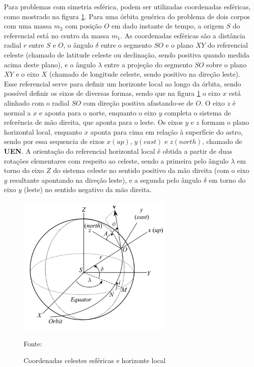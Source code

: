 Para problemas com simetria esférica, podem ser utilizadas coordenadas esféricas, como mostrado na figura \ref{fig:ESFCEL}. Para uma órbita genérica do problema de dois corpos com uma massa $m_{2}$ com posição $O$ em dado instante de tempo, a origem $S$ do referencial está no centro da massa $m_{1}$. As coordenadas esféricas são a distância radial $r$ entre $S$ e $O$, o ângulo $\delta$ entre o segmento $SO$ e o plano $XY$ do referencial celeste (chamado de latitude celeste ou declinação, sendo positiva quando medida acima deste plano), e o ângulo $\lambda$ entre a projeção do segmento $SO$ sobre o plano $XY$ e o eixo $X$ (chamado de longitude celeste, sendo positivo na direção leste). Esse referencial serve para definir um horizonte local ao longo da órbita, sendo possível definir os eixos de diversas formas, sendo que na figura \ref{fig:ESFCEL} o eixo $x$ está alinhado com o radial $SO$ com direção positiva afastando-se de $O$. O eixo $z$ é normal a $x$ e aponta para o norte, enquanto o eixo $y$ completa o sistema de referência de mão direita, que aponta para o leste. Os eixos $y$ e $z$ formam o plano horizontal local, enquanto $x$ aponta para cima em relação à superfície do astro, sendo por essa sequencia de eixos $x (up)$, $y (east)$ e $z (north)$, chamado de \textbf{UEN}. A orientação do referencial horizontal local é obtida a partir de duas rotações elementares com respeito ao celeste, sendo a primeira pelo ângulo $\lambda$ em torno do eixo $Z$ do sistema celeste no sentido positivo da mão direita (com o eixo $y$ resultante apontando na direção leste), e a segunda pelo ângulo $\delta$ em torno do eixo $y$ (leste) no sentido negativo da mão direita. 

\begin{figure}[h]
        \centering
        \includegraphics[width=3in]{figuras/ESFCEL.png}
        \caption{Coordenadas celestes esféricas e horizonte local}
        \footnotesize Fonte: \cite{livro:andre}
        \label{fig:ESFCEL}
\end{figure} 

